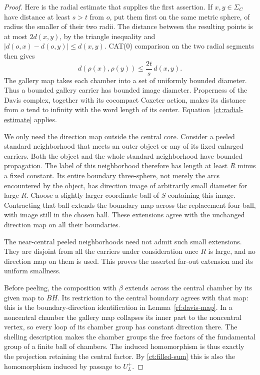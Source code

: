 \documentclass[11pt]{article}
\theoremstyle{definition}
\theoremstyle{remark}
\begin{document}
\begin{proof}
Here is the radial estimate that supplies the first assertion.  If
$x,y\in\Sigma_C$ have distance at least $s>t$ from $o$, put them first
on the same metric sphere, of radius the smaller of their two radii.
The distance between the resulting points is at most $2d(x,y)$,
by the triangle inequality and
$|d(o,x)-d(o,y)|\leq d(x,y)$.  CAT(0) comparison on the two radial
segments then gives
\begin{equation}\label{ct:radial-estimate}
                  d(\rho(x),\rho(y))
                  \leq \frac{2t}{s}\,d(x,y).
\end{equation}
The gallery map takes each chamber into a set of uniformly bounded
diameter.  Thus a bounded gallery carrier has bounded image diameter.
Properness of the Davis complex, together with its cocompact Coxeter
action, makes its distance from $o$ tend to infinity with the word
length of its center.  Equation~\eqref{ct:radial-estimate} applies.

We only need the direction map outside the central core.  Consider a
peeled standard neighborhood that meets an outer object or any of
its fixed enlarged carriers.  Both the object and the whole standard
neighborhood have bounded propagation.  The label of this neighborhood
therefore has length at least $R$ minus a fixed constant.  Its entire
boundary three-sphere, not merely the arcs encountered by the object,
has direction image of arbitrarily small diameter for large $R$.
Choose a slightly larger coordinate ball of $S$ containing this image.
Contracting that ball extends the boundary map across the replacement
four-ball, with image still in the chosen ball.  These extensions
agree with the unchanged direction map on all their boundaries.

The near-central peeled neighborhoods need not admit such small
extensions.  They are disjoint from all the carriers under consideration
once $R$ is large, and no direction map on them is used.  This proves
the asserted far-out extension and its uniform smallness.

Before peeling, the composition with $\beta$ extends across the
central chamber by its given map to $BH$.  Its restriction to the
central boundary agrees with that map: this is the boundary-direction
identification in Lemma~\ref{rf:davis-map}.  In a noncentral chamber
the gallery map collapses its inner part to the noncentral vertex,
so every loop of its chamber group has constant direction there.
The shelling description makes the chamber groups the free factors
of the fundamental group of a finite ball of chambers.  The induced
homomorphism is thus exactly the projection retaining the central
factor.  By \eqref{ct:filled-sum} this is also the homomorphism induced
by passage to $U_L^+$.


\end{proof}
\end{document}
